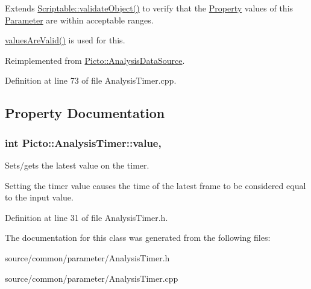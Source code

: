 Extends \hyperlink{class_picto_1_1_scriptable_ab6e2944c43a3b5d418bf7b251594386d}{Scriptable\-::validate\-Object()} to verify that the \hyperlink{class_picto_1_1_property}{Property} values of this \hyperlink{class_picto_1_1_parameter}{Parameter} are within acceptable ranges. 

\hyperlink{class_picto_1_1_parameter_a3443808da4c3edf26f2c3c3772d95b10}{values\-Are\-Valid()} is used for this. 

Reimplemented from \hyperlink{class_picto_1_1_analysis_data_source_a8d43777d1a7d1b1467c9df205d118bb3}{Picto\-::\-Analysis\-Data\-Source}.



Definition at line 73 of file Analysis\-Timer.\-cpp.



\subsection{Property Documentation}
\hypertarget{class_picto_1_1_analysis_timer_a306d79a087eb6fe3e89de8abbc0b45c8}{
\subsubsection[{value}]{\setlength{\rightskip}{0pt plus 5cm}int Picto\-::\-Analysis\-Timer\-::value\hspace{0.3cm}{\ttfamily [read]}, {\ttfamily [write]}}}\label{class_picto_1_1_analysis_timer_a306d79a087eb6fe3e89de8abbc0b45c8}


Sets/gets the latest value on the timer. 

Setting the timer value causes the time of the latest frame to be considered equal to the input value. 

Definition at line 31 of file Analysis\-Timer.\-h.



The documentation for this class was generated from the following files\-:\begin{DoxyCompactItemize}
\item 
source/common/parameter/Analysis\-Timer.\-h\item 
source/common/parameter/Analysis\-Timer.\-cpp\end{DoxyCompactItemize}
